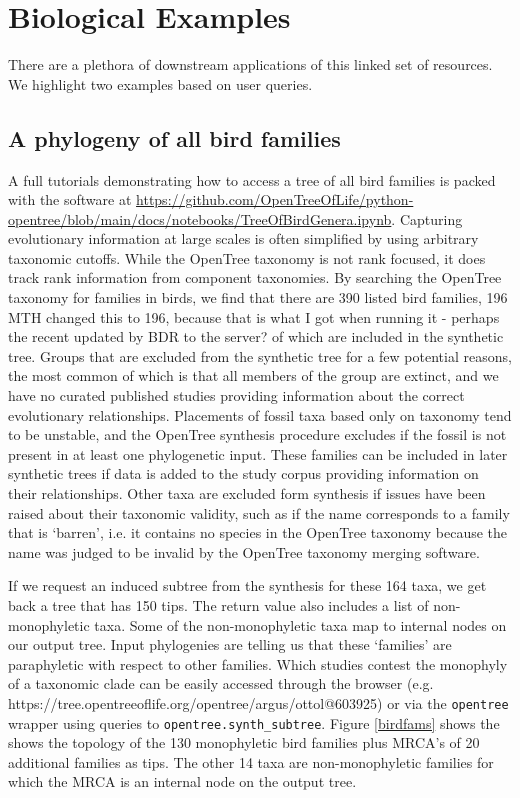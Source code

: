 \documentclass[oupdraft]{sysbio_sse}
\begin{document}
\bigskip

\section{Biological Examples}
\label{sec4}

There are a plethora of downstream applications of this linked set of resources.
We highlight two examples based on user queries.


\subsection{A phylogeny of all bird families}
A full tutorials demonstrating how to access a tree of all bird families is packed with the software at \url{https://github.com/OpenTreeOfLife/python-opentree/blob/main/docs/notebooks/TreeOfBirdGenera.ipynb}.
Capturing evolutionary information at large scales is often simplified by using arbitrary taxonomic cutoffs.
While the OpenTree taxonomy is not rank focused, it does track rank information from component taxonomies.
By searching the OpenTree taxonomy for families in birds, we find that there are 390 listed bird families, 196 {\color{red} MTH changed this to 196, because that is what I got when running it - perhaps the recent updated by BDR to the server?} of which are included in the synthetic tree.
Groups that are excluded from the synthetic tree for a few potential reasons, the most common of which is that all members of the group are extinct, and we have no curated published studies providing information about the correct evolutionary relationships.
Placements of fossil taxa based only on taxonomy tend to be unstable, and the OpenTree synthesis procedure excludes if the fossil is not present in at least one  phylogenetic input.
These families can be included in later synthetic trees if data is added to the study corpus providing information on their relationships.
Other taxa are excluded form synthesis if issues have been raised about their taxonomic validity, such as if the name corresponds to a family that is `barren', i.e. it contains no species in the OpenTree taxonomy because the name was judged to be invalid by the OpenTree taxonomy merging software\citep{rees_automated_2017}.

If we request an induced subtree from the synthesis for these 164 taxa, we get back a tree that has 150 tips. The return value also includes a list of non-monophyletic taxa.
Some of the non-monophyletic taxa map to internal nodes on our output tree. Input phylogenies are telling us that these `families' are paraphyletic with respect to other families. Which studies contest the monophyly of a taxonomic clade can be easily accessed through the browser (e.g. https://tree.opentreeoflife.org/opentree/argus/ottol@603925) or via the \texttt{opentree} wrapper using queries to \texttt{opentree.synth\_subtree}. Figure \ref{birdfams} shows the shows the topology of the 130 monophyletic bird families plus MRCA's of 20 additional families as tips. The other 14 taxa are non-monophyletic families for which the MRCA is an internal node on the output tree.
\end{document}
